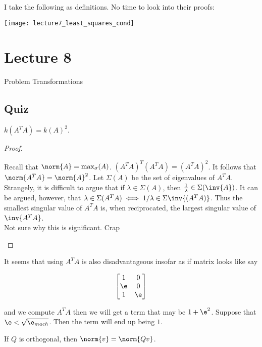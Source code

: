 \documentclass[../main.tex]{subfiles}
\begin{document}
\begin{definition}
    I take the following as definitions. No time to look into their proofs:
    \begin{center}
        \texttt{[image: lecture7\_least\_squares\_cond]}
    \end{center}
\end{definition}


\section{Lecture 8}{Problem Transformations}

\subsection{Quiz}
\begin{proposition}
    $k(A^TA) = k(A)^2$.
\end{proposition}
\begin{proof}
    \begin{outline}
        \1 Recall that $\norm{A} = \max_{\sigma}(A)$.
        \1 $(A^TA)^T(A^TA) = (A^TA)^2$.
        \2 It follows that $\norm{A^TA} = \norm{A}^2$.
        \1 Let $\Sigma(A)$ be the set of eigenvalues of $A^TA$. Strangely, it is difficult to argue that if $\lambda \in \Sigma(A)$, then
        $\frac{1}{\lambda} \in \Sigma(\inv{A})$. It can be argued, however, that $\lambda \in \Sigma(A^TA) \iff 1/\lambda \in \Sigma{\inv{(A^TA)}}$. 
        Thus the smallest singular value of $A^TA$ is, when reciprocated, the largest singular value of $\inv{A^TA}$. \\
        Not sure why this is significant. Crap
    \end{outline}
\end{proof}
\begin{remark}
    It seems that using $A^TA$ is also disadvantageous insofar as if matrix looks like say

    \[
        \begin{bmatrix}
            1 & 0\\
            \e & 0\\
            1 & \e\\
        \end{bmatrix}
    \]

    and we compute $A^TA$ then we will get a term that may be $1 + \e^2$. Suppose that $\e < \sqrt{\e_{mach}}$. Then the term
    will end up being $1$.
\end{remark}
\begin{remark}
    If $Q$ is orthogonal, then $\norm{v} = \norm{Qv}$.
\end{remark}
\end{document}
